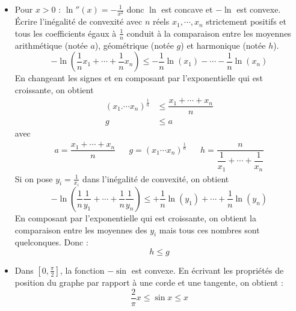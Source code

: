 \begin{exples}
 \begin{itemize}
 \item Pour $x>0$ : $\ln''(x)=-\frac{1}{x^2}$ donc $\ln$ est concave et $-\ln$ est convexe.\newline
\'Ecrire l'inégalité de convexité avec $n$ réels $x_1,\cdots,x_n$ strictement positifs et tous les coefficients égaux à $\frac{1}{n}$ conduit à la comparaison entre les moyennes arithmétique (notée $a$), géométrique (notée $g$) et harmonique (notée $h$).
\begin{displaymath}
 -\ln\left(\dfrac{1}{n}x_1+\cdots+ \dfrac{1}{n}x_n \right) \leq -\dfrac{1}{n}\ln(x_1)-\cdots -\dfrac{1}{n}\ln(x_n)
\end{displaymath}
En changeant les signes et en composant par l'exponentielle qui est croissante, on obtient
\begin{align*}
 (x_1.\cdots x_n)^{\frac{1}{n}} &\leq \dfrac{x_1+\cdots + x_n}{n}\\
 g &\leq a
\end{align*}
avec 
\begin{align*}
 a = \dfrac{x_1+\cdots+x_n}{n} & & g = \left(x_1\cdots x_n \right)^{\frac{1}{n}} & & h = \dfrac{n}{\dfrac{1}{x_1}+\cdots +\dfrac{1}{x_n}} 
\end{align*}
Si on pose $y_i=\frac{1}{x_i}$ dans l'inégalité de convexité, on obtient
\begin{displaymath}
 -\ln\left(\dfrac{1}{n}\dfrac{1}{y_1}+\cdots+ \dfrac{1}{n}\dfrac{1}{y_n} \right) \leq +\dfrac{1}{n}\ln(y_1)+\cdots +\dfrac{1}{n}\ln(y_n)
\end{displaymath}
En composant par l'exponentielle qui est croissante, on obtient la comparaison entre les moyennes des $y_i$ mais tous ces nombres sont quelconques. Donc :
\begin{displaymath}
 h \leq g
\end{displaymath}


\item Dans $[0,\frac{\pi}{2}]$, la fonction $-\sin$ est convexe. En écrivant les propriétés de position du graphe par rapport à une corde et une tangente, on obtient :
\begin{displaymath}
 \dfrac{2}{\pi}x\leq \sin x\leq x
\end{displaymath}
\end{itemize}
\end{exples}


